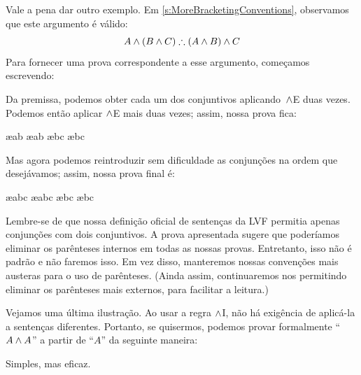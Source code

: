 Vale a pena dar outro exemplo. Em \cref{s:MoreBracketingConventions}, observamos que este argumento é válido:
	$$A \eand (B \eand C) \therefore (A \eand B) \eand C$$
Para fornecer uma prova correspondente a esse argumento, começamos escrevendo:
\begin{fitchproof}
	\PR
\end{fitchproof}
Da premissa, podemos obter cada um dos conjuntivos aplicando~$\wedge$E duas vezes. Podemos então aplicar $\wedge$E mais duas vezes; assim, nossa prova fica:
\begin{fitchproof}
	\PR
	 \ae{ab}
	 \ae{ab}
	 \ae{bc}
	 \ae{bc}
\end{fitchproof}
Mas agora podemos reintroduzir sem dificuldade as conjunções na ordem que desejávamos; assim, nossa prova final é:
\begin{fitchproof}
	\PR
	 \ae{abc}
	 \ae{abc}
	 \ae{bc}
	 \ae{bc}
\end{fitchproof}
Lembre-se de que nossa definição oficial de sentenças da LVF permitia apenas conjunções com dois conjuntivos. A prova apresentada sugere que poderíamos eliminar os parênteses internos em todas as nossas provas. Entretanto, isso não é padrão e não faremos isso. Em vez disso, manteremos nossas convenções mais austeras para o uso de parênteses. (Ainda assim, continuaremos nos permitindo eliminar os parênteses mais externos, para facilitar a leitura.)

Vejamos uma última ilustração. Ao usar a regra $\wedge$I, não há exigência de aplicá-la a sentenças diferentes. Portanto, se quisermos, podemos provar formalmente \textquotedblleft$A \wedge A$\textquotedblright{} a partir de \textquotedblleft$A$\textquotedblright{} da seguinte maneira:
\begin{fitchproof}
	\PR
\end{fitchproof}
Simples, mas eficaz.

